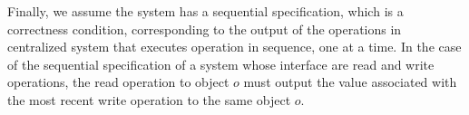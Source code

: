 \documentclass{sig-alternate-05-2015}
\begin{document}

Finally, we assume the system has a sequential specification, which is a correctness condition, corresponding to the output of the operations in centralized system that executes operation in sequence, one at a time. In the case of the sequential specification of a system whose interface are read and write operations, the read operation to object $o$ must output the value associated with the most recent write operation to the same object $o$.
\newtheorem{definition}{Definition}
\end{document}
